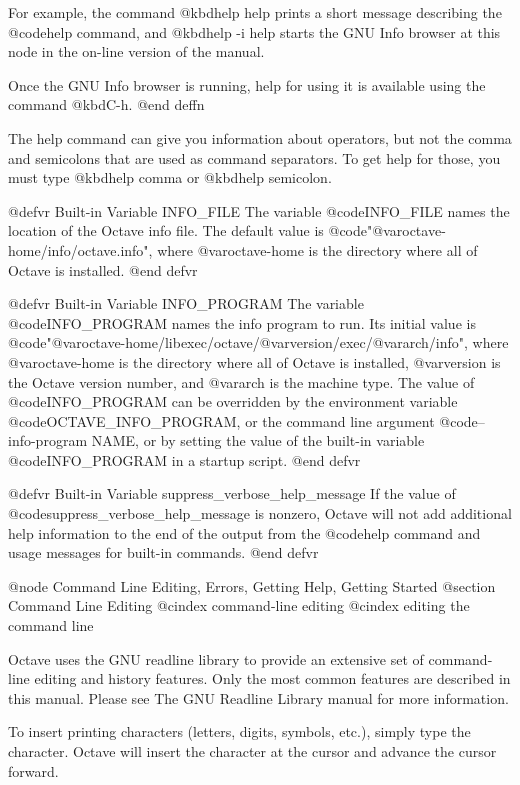 For example, the command @kbd{help help} prints a short message
describing the @code{help} command, and @kbd{help -i help} starts the
GNU Info browser at this node in the on-line version of the manual.

Once the GNU Info browser is running, help for using it is available
using the command @kbd{C-h}.
@end deffn

The help command can give you information about operators, but not the
comma and semicolons that are used as command separators.  To get help
for those, you must type @kbd{help comma} or @kbd{help semicolon}.

@defvr {Built-in Variable} INFO_FILE
The variable @code{INFO_FILE} names the location of the Octave info file.
The default value is @code{"@var{octave-home}/info/octave.info"}, where
@var{octave-home} is the directory where all of Octave is installed.
@end defvr

@defvr {Built-in Variable} INFO_PROGRAM
The variable @code{INFO_PROGRAM} names the info program to run.  Its
initial value is
@code{"@var{octave-home}/libexec/octave/@var{version}/exec/@var{arch}/info"},
where @var{octave-home} is the directory where all of Octave is
installed, @var{version} is the Octave version number, and @var{arch} is
the machine type.  The value of @code{INFO_PROGRAM} can be overridden by
the environment variable @code{OCTAVE_INFO_PROGRAM}, or the command line
argument @code{--info-program NAME}, or by setting the value of the
built-in variable @code{INFO_PROGRAM} in a startup script.
@end defvr

@defvr {Built-in Variable} suppress_verbose_help_message
If the value of @code{suppress_verbose_help_message} is nonzero, Octave
will not add additional help information to the end of the output from
the @code{help} command and usage messages for built-in commands.
@end defvr

@node Command Line Editing, Errors, Getting Help, Getting Started
@section Command Line Editing
@cindex command-line editing
@cindex editing the command line

Octave uses the GNU readline library to provide an extensive set of
command-line editing and history features.  Only the most common
features are described in this manual.  Please see The GNU Readline
Library manual for more information.

To insert printing characters (letters, digits, symbols, etc.), simply
type the character.  Octave will insert the character at the cursor and
advance the cursor forward.

